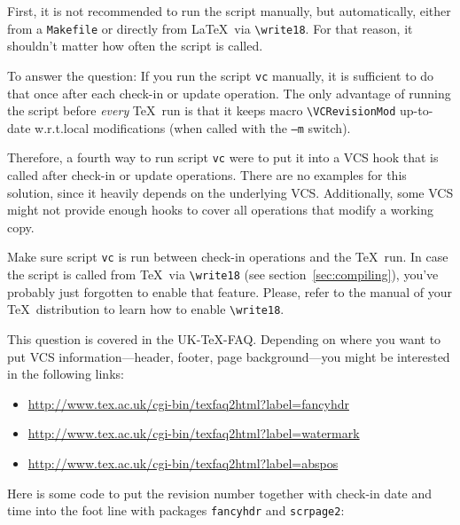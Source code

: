 \documentclass[11pt]{article}
\begin{document}
 First, it is not recommended to run the script
manually, but automatically, either from a \texttt{Makefile} or directly
from \LaTeX\ via \verb+\write18+.  For that reason, it shouldn't matter
how often the script is called.

To answer the question: If you run the script \texttt{vc} manually, it
is sufficient to do that once after each check-in or update operation.
The only advantage of running the script before \emph{every} \TeX\ run
is that it keeps macro \verb+\VCRevisionMod+ up-to-date w.r.t.\@ local
modifications (when called with the \texttt{--m} switch).

Therefore, a fourth way to run script \texttt{vc} were to put it into a
VCS hook that is called after check-in or update operations.  There are
no examples for this solution, since it heavily depends on the
underlying VCS.  Additionally, some VCS might not provide enough hooks
to cover all operations that modify a working copy.

 Make sure script \texttt{vc} is run between
check-in operations and the \TeX\ run.  In case the script is called
from \TeX\ via \verb+\write18+ (see section~\ref{sec:compiling}), you've
probably just forgotten to enable that feature.  Please, refer to the
manual of your \TeX\ distribution to learn how to enable
\verb+\write18+.

 This question is covered in the UK-TeX-FAQ.
Depending on where you want to put VCS information---header, footer,
page background---you might be interested in the following links:
\begin{itemize}
\item \url{http://www.tex.ac.uk/cgi-bin/texfaq2html?label=fancyhdr}
\item \url{http://www.tex.ac.uk/cgi-bin/texfaq2html?label=watermark}
\item \url{http://www.tex.ac.uk/cgi-bin/texfaq2html?label=abspos}
\end{itemize}
Here is some code to put the revision number together with check-in date
and time into the foot line with packages \texttt{fancyhdr} and
\texttt{scrpage2}:
\begin{listing}[style=TeX]
\usepackage{fancyhdr}
\pagestyle{fancy}
\end{listing}
\begin{listing}[style=TeX]
\usepackage{scrpage2}
\pagestyle{scrheadings}
\end{listing}
\end{document}
